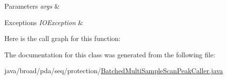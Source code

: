 \begin{DoxyParams}{Parameters}
{\em args} & \\
\hline
\end{DoxyParams}

\begin{DoxyExceptions}{Exceptions}
{\em I\+O\+Exception} & \\
\hline
\end{DoxyExceptions}


Here is the call graph for this function\+:




The documentation for this class was generated from the following file\+:\begin{DoxyCompactItemize}
\item 
java/broad/pda/seq/protection/\hyperlink{_batched_multi_sample_scan_peak_caller_8java}{Batched\+Multi\+Sample\+Scan\+Peak\+Caller.\+java}\end{DoxyCompactItemize}
